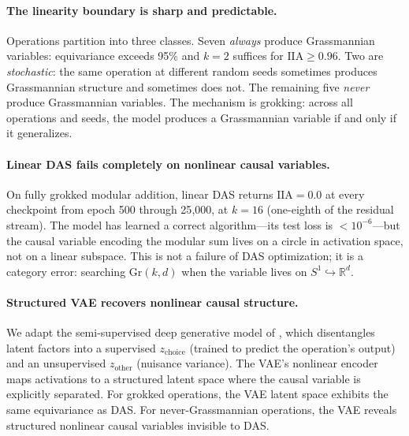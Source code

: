 \documentclass{article}
\newcommand{\Gr}{\mathrm{Gr}}
\newcommand{\IIA}{\mathrm{IIA}}
\newcommand{\R}{\mathbb{R}}
\begin{document}
\paragraph{The linearity boundary is sharp and predictable.}
Operations partition into three classes. Seven \emph{always} produce Grassmannian
variables: equivariance exceeds 95\% and $k=2$ suffices for $\IIA \geq 0.96$.
Two are \emph{stochastic}: the same operation at different random seeds sometimes
produces Grassmannian structure and sometimes does not. The remaining five
\emph{never} produce Grassmannian variables. The mechanism is grokking: across all
operations and seeds, the model produces a Grassmannian variable if and only if it
generalizes.

\paragraph{Linear DAS fails completely on nonlinear causal variables.}
On fully grokked modular addition, linear DAS returns $\IIA = 0.0$ at every
checkpoint from epoch 500 through 25{,}000, at $k = 16$ (one-eighth of the
residual stream). The model has learned a correct algorithm---its test loss is
$< 10^{-6}$---but the causal variable encoding the modular sum lives on a
circle in activation space, not on a linear subspace. This is not a failure of
DAS optimization; it is a category error: searching $\Gr(k,d)$ when the
variable lives on $S^1 \hookrightarrow \R^d$.

\paragraph{Structured VAE recovers nonlinear causal structure.}
We adapt the semi-supervised deep generative model of
\citet{narayanaswamy2017learning}, which disentangles latent factors into a
supervised $z_\text{choice}$ (trained to predict the operation's output) and an
unsupervised $z_\text{other}$ (nuisance variance). The VAE's nonlinear encoder
maps activations to a structured latent space where the causal variable is
explicitly separated. For grokked operations, the VAE latent space exhibits the
same equivariance as DAS. For never-Grassmannian operations, the VAE reveals
structured nonlinear causal variables invisible to DAS.

\end{document}
